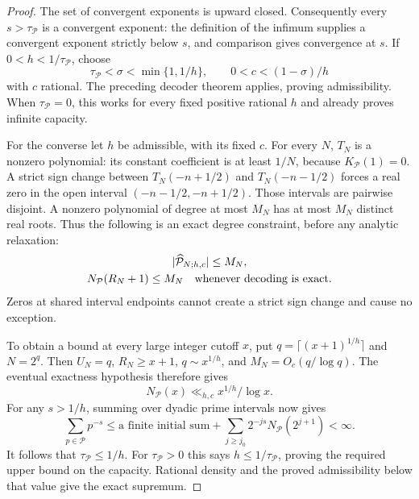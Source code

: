 \documentclass[11pt]{article}
\theoremstyle{definition}
\begin{document}
\begin{proof}
The set of convergent exponents is upward closed.
Consequently every $s>\tau_{\mathcal P}$ is a convergent
exponent: the definition of the infimum supplies a convergent
exponent strictly below $s$, and comparison gives convergence at $s$.
If $0<h<1/\tau_{\mathcal P}$, choose
\[
 \tau_{\mathcal P}<\sigma<\min\{1,1/h\},
       \qquad 0<c<(1-\sigma)/h
\]
with $c$ rational.
The preceding decoder theorem applies, proving admissibility.
When $\tau_{\mathcal P}=0$, this works for every fixed
positive rational $h$ and already proves infinite capacity.

For the converse let $h$ be admissible, with its fixed $c$.
For every $N$, $T_N$ is a nonzero polynomial:
its constant coefficient is at least $1/N$, because
$K_{\mathcal P}(1)=0$.
A strict sign change between $T_N(-n+1/2)$ and
$T_N(-n-1/2)$ forces a real zero in the open interval
$(-n-1/2,-n+1/2)$.
Those intervals are pairwise disjoint.
A nonzero polynomial of degree at most $M_N$ has at most
$M_N$ distinct real roots.
Thus the following is an exact degree constraint, before any
analytic relaxation:
\begin{equation}
 \begin{gathered}
       |\widehat{\mathcal P}_{N;h,c}|\le M_N,\\
       N_{\mathcal P}(R_N+1)\le M_N
                 \quad\hbox{whenever decoding is exact}.
 \end{gathered}
 \label{eq:prime-decoding-degree-obstruction}
\end{equation}
Zeros at shared interval endpoints cannot create a strict
sign change and cause no exception.

To obtain a bound at every large integer cutoff $x$, put
$q=\lceil(x+1)^{1/h}\rceil$ and $N=2^q$.
Then $U_N=q$, $R_N\ge x+1$,
$q\sim x^{1/h}$, and
$M_N=O_c(q/\log q)$.
The eventual exactness hypothesis therefore gives
\[
 N_{\mathcal P}(x)\ll_{h,c}x^{1/h}/\log x .
\]
For any $s>1/h$, summing over dyadic prime intervals now gives
\[
 \sum_{p\in\mathcal P}p^{-s}
    \le\text{a finite initial sum}
       +\sum_{j\ge j_0}2^{-js}N_{\mathcal P}(2^{j+1})
    <\infty .
\]
It follows that $\tau_{\mathcal P}\le1/h$.
For $\tau_{\mathcal P}>0$ this says
$h\le1/\tau_{\mathcal P}$, proving the required upper bound
on the capacity.
Rational density and the proved admissibility below that value
give the exact supremum.


\end{proof}
\end{document}
